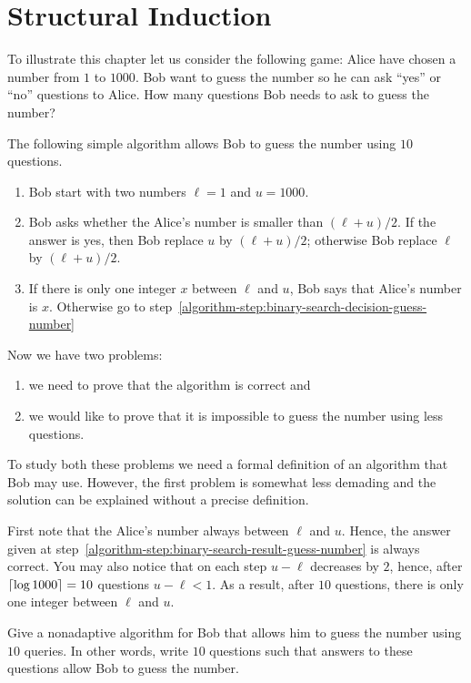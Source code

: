\chapter{Structural Induction}
To illustrate this chapter let us consider the following game:
Alice have chosen a number from $1$ to $1000$. Bob want to guess the number
so he can ask ``yes'' or ``no'' questions to Alice.
How many questions Bob needs to ask to guess the number?

The following simple algorithm allows Bob to guess the number using $10$
questions.
\begin{enumerate}
  \item Bob start with two numbers $\ell = 1$ and $u = 1000$.
  \item \label{algorithm-step:binary-search-decision-guess-number}
    Bob asks whether the Alice's number is smaller than $(\ell + u) / 2$.
    If the answer is yes, then Bob replace $u$ by $(\ell + u) / 2$;
    otherwise Bob replace $\ell$ by $(\ell + u) / 2$.
  \item \label{algorithm-step:binary-search-result-guess-number}
    If there is only one integer $x$ between $\ell$ and $u$, Bob
    says that Alice's number is $x$. Otherwise go to
    step~\ref{algorithm-step:binary-search-decision-guess-number}
\end{enumerate}

Now we have two problems:
\begin{enumerate}
  \item we need to prove that the algorithm is correct and
  \item we would like to prove that it is impossible to guess the number
    using less questions.
\end{enumerate}

To study both these problems we need a formal definition of an algorithm that
Bob may use. However, the first problem is somewhat less demading and
the solution can be explained without a precise definition.

First note that the Alice's number always between $\ell$ and $u$. Hence,
the answer given at step~\ref{algorithm-step:binary-search-result-guess-number}
is always correct. You may also notice that on each step $u - \ell$
decreases by $2$, hence, after $\left\lceil {\log 1000} \right\rceil = 10$ questions $u - \ell < 1$.
As a result, after $10$ questions, there is only one integer between $\ell$ and
$u$.

\begin{exercise}
  Give a nonadaptive algorithm for Bob that allows him to guess the number
  using $10$ queries. In other words, write $10$ questions such that
  answers to these questions allow Bob to guess the number.
\end{exercise}

